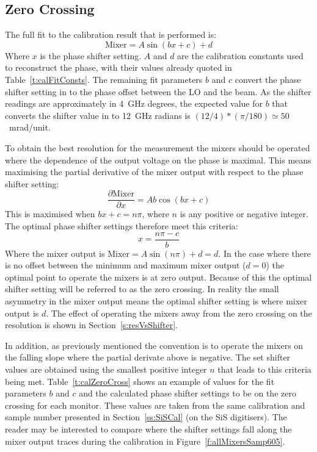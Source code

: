 \subsection{Zero Crossing}
\label{ss:calZeroCross}

The full fit to the calibration result that is performed is:
\begin{equation}
\mathrm{Mixer} = A\sin(bx + c) + d
\end{equation}
Where \(x\) is the phase shifter setting. \(A\) and \(d\) are the calibration constants used to reconstruct the phase, with their values already quoted in Table~\ref{t:calFitConsts}. The remaining fit parameters \(b\) and \(c\) convert the phase shifter setting in to the phase offset between the LO and the beam. As the shifter readings are approximately in 4~GHz degrees, the expected value for \(b\) that converts the shifter value in to 12~GHz radians is \((12/4)*(\pi/180) \simeq 50\)~mrad/unit.

To obtain the best resolution for the measurement the mixers should be operated where the dependence of the output voltage on the phase is maximal. This means maximising the partial derivative of the mixer output with respect to the phase shifter setting:
\begin{equation}
\frac{\partial \mathrm{Mixer}}{\partial x} = Ab\cos(bx+c)
\end{equation}
This is maximised when \(bx + c = n\pi\), where \(n\) is any positive or negative integer. The optimal phase shifter settings therefore meet this criteria:
\begin{equation}
x = \frac{n\pi-c}{b}
\end{equation}
Where the mixer output is \(\mathrm{Mixer} = A\sin(n\pi)+d = d\). In the case where there is no offset between the minimum and maximum mixer output (\(d=0\)) the optimal point to operate the mixers is at zero output. Because of this the optimal shifter setting will be referred to as the zero crossing. In reality the small asymmetry in the mixer output means the optimal shifter setting is where mixer output is \(d\). The effect of operating the mixers away from the zero crossing on the resolution is shown in Section~\ref{s:resVsShifter}.

In addition, as previously mentioned the convention is to operate the mixers on the falling slope where the partial derivate above is negative. The set shifter values are obtained using the smallest positive integer \(n\) that leads to this criteria being met. Table~\ref{t:calZeroCross} shows an example of values for the fit parameters \(b\) and \(c\) and the calculated phase shifter settings to be on the zero crossing for each monitor. These values are taken from the same calibration and sample number presented in Section~\ref{ss:SiSCal} (on the SiS digitisers). The reader may be interested to compare where the shifter settings fall along the mixer output traces during the calibration in Figure~\ref{f:allMixersSamp605}.

